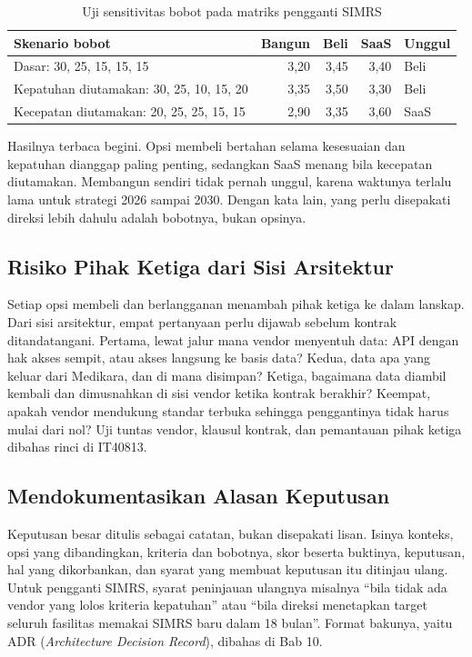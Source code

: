 \begin{table}[!htb]
  \centering
  \caption{Uji sensitivitas bobot pada matriks pengganti SIMRS}
  \label{tab:ch09-sensitivitas}
  \small
  \begin{tabularx}{\textwidth}{Xrrrl}
    \hline
    \textbf{Skenario bobot} & \textbf{Bangun} & \textbf{Beli} & \textbf{SaaS} & \textbf{Unggul} \\
    \hline
    Dasar: 30, 25, 15, 15, 15 & 3,20 & 3,45 & 3,40 & Beli \\
    \hline
    Kepatuhan diutamakan: 30, 25, 10, 15, 20 & 3,35 & 3,50 & 3,30 & Beli \\
    \hline
    Kecepatan diutamakan: 20, 25, 25, 15, 15 & 2,90 & 3,35 & 3,60 & SaaS \\
    \hline
  \end{tabularx}
\end{table}

Hasilnya terbaca begini. Opsi membeli bertahan selama kesesuaian dan
kepatuhan dianggap paling penting, sedangkan SaaS menang bila kecepatan
diutamakan. Membangun sendiri tidak pernah unggul, karena waktunya terlalu
lama untuk strategi 2026 sampai 2030. Dengan kata lain, yang perlu disepakati
direksi lebih dahulu adalah bobotnya, bukan opsinya.

\subsection*{Risiko Pihak Ketiga dari Sisi Arsitektur}

Setiap opsi membeli dan berlangganan menambah pihak ketiga ke dalam lanskap.
Dari sisi arsitektur, empat pertanyaan perlu dijawab sebelum kontrak
ditandatangani. Pertama, lewat jalur mana vendor menyentuh data: API dengan
hak akses sempit, atau akses langsung ke basis data? Kedua, data apa yang
keluar dari Medikara, dan di mana disimpan? Ketiga, bagaimana data diambil
kembali dan dimusnahkan di sisi vendor ketika kontrak berakhir? Keempat,
apakah vendor mendukung standar terbuka sehingga penggantinya tidak harus
mulai dari nol? Uji tuntas vendor, klausul kontrak, dan pemantauan pihak
ketiga dibahas rinci di IT40813.

\subsection*{Mendokumentasikan Alasan Keputusan}

Keputusan besar ditulis sebagai catatan, bukan disepakati lisan. Isinya
konteks, opsi yang dibandingkan, kriteria dan bobotnya, skor beserta
buktinya, keputusan, hal yang dikorbankan, dan syarat yang membuat keputusan
itu ditinjau ulang. Untuk pengganti SIMRS, syarat peninjauan ulangnya
misalnya ``bila tidak ada vendor yang lolos kriteria kepatuhan'' atau ``bila
direksi menetapkan target seluruh fasilitas memakai SIMRS baru dalam 18
bulan''. Format bakunya, yaitu ADR (\textit{Architecture Decision Record}),
dibahas di Bab 10.

